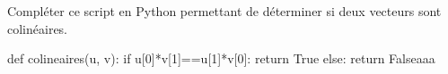 \documentclass[a4paper]{article}
\begin{document}
    \begin{exercice}{}{}
    Compléter ce script en Python permettant de déterminer si deux vecteurs sont colinéaires.
      \begin{center}
        \begin{CodePythontexAlt}[Largeur=0.75\linewidth, Centre, Lignes=false]{}
          def colineaires(u, v):
          if u[0]*v[1]==u[1]*v[0]:
            return True
          else:
            return Falseaaa
          \end{CodePythontexAlt}
      \end{center}
    \end{exercice}
\end{document}
